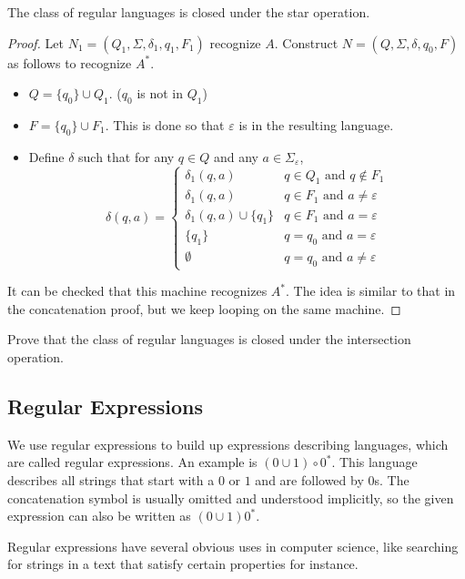 \begin{theorem}
The class of regular languages is closed under the star operation.
\end{theorem}
\begin{proof}
Let $N_1=(Q_1,\Sigma,\delta_1,q_1,F_1)$ recognize $A$. Construct $N=(Q,\Sigma,\delta,q_0,F)$ as follows to recognize $A^*$.
\begin{itemize}
    \item $Q=\{q_0\}\cup Q_1$. ($q_0$ is not in $Q_1$)
    \item $F=\{q_0\}\cup F_1$. This is done so that $\varepsilon$ is in the resulting language.
    \item Define $\delta$ such that for any $q\in Q$ and any $a\in\Sigma_\varepsilon$,
    $$
    \delta(q,a)=
    \begin{cases}
    \delta_1(q,a) & q\in Q_1\text{ and }q\not\in F_1 \\
    \delta_1(q,a) & q\in F_1\text{ and }a\neq\varepsilon \\
    \delta_1(q,a)\cup\{q_1\} & q\in F_1\text{ and }a=\varepsilon \\
    \{q_1\} & q=q_0\text{ and }a=\varepsilon \\
    \emptyset & q=q_0\text{ and }a\neq\varepsilon
    \end{cases}
    $$
\end{itemize}

It can be checked that this machine recognizes $A^*$. The idea is similar to that in the concatenation proof, but we keep looping on the same machine.
\end{proof}

\begin{exercise}
Prove that the class of regular languages is closed under the intersection operation.
\end{exercise}
\clearpage

\subsection{Regular Expressions}
We use regular expressions to build up expressions describing languages, which are called regular expressions. An example is $(0\cup 1)\circ 0^*$. This language describes all strings that start with a $0$ or $1$ and are followed by $0$s. The concatenation symbol is usually omitted and understood implicitly, so the given expression can also be written as $(0\cup 1)0^*$.

\vspace{2mm}
Regular expressions have several obvious uses in computer science, like searching for strings in a text that satisfy certain properties for instance.

